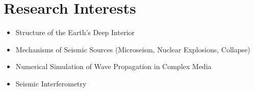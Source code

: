 \section*{Research Interests}

\begin{itemize}
\item Structure of the Earth's Deep Interior
\item Mechanisms of Seismic Sources (Microseism, Nuclear Explosions, Collapse)
\item Numerical Simulation of Wave Propagation in Complex Media
\item Seismic Interferometry
\end{itemize}
